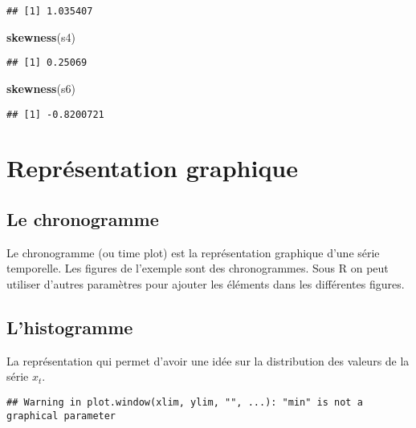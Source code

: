 \documentclass[
]{book}
\newenvironment{Shaded}{\begin{snugshade}}{\end{snugshade}}
\newcommand{\FunctionTok}[1]{\textcolor[rgb]{0.13,0.29,0.53}{\textbf{#1}}}
\newcommand{\NormalTok}[1]{#1}
\theoremstyle{definition}
\theoremstyle{definition}
\theoremstyle{definition}
\theoremstyle{definition}
\theoremstyle{remark}
\begin{document}
\begin{verbatim}
## [1] 1.035407
\end{verbatim}

\begin{Shaded}
\begin{Highlighting}[]
\FunctionTok{skewness}\NormalTok{(s4)}
\end{Highlighting}
\end{Shaded}

\begin{verbatim}
## [1] 0.25069
\end{verbatim}

\begin{Shaded}
\begin{Highlighting}[]
\FunctionTok{skewness}\NormalTok{(s6)}
\end{Highlighting}
\end{Shaded}

\begin{verbatim}
## [1] -0.8200721
\end{verbatim}

\hypertarget{repruxe9sentation-graphique}{%
\section{Représentation graphique}\label{repruxe9sentation-graphique}}

\hypertarget{le-chronogramme}{%
\subsection{Le chronogramme}\label{le-chronogramme}}

Le chronogramme (ou time plot) est la représentation graphique d'une série temporelle. Les figures de l'exemple sont des chronogrammes. Sous R on peut utiliser d'autres paramètres pour ajouter les éléments dans les différentes figures.

\hypertarget{lhistogramme}{%
\subsection{L'histogramme}\label{lhistogramme}}

La représentation qui permet d'avoir une idée sur la distribution des valeurs de la série \(x_t\).

\begin{verbatim}
## Warning in plot.window(xlim, ylim, "", ...): "min" is not a graphical parameter
\end{verbatim}
\end{document}
